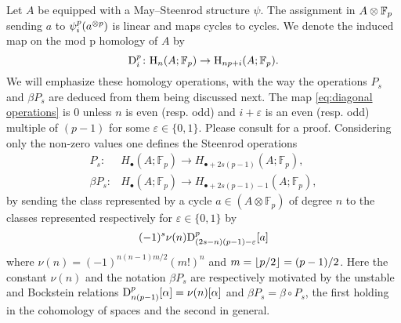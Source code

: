 Let $A$ be equipped with a May--Steenrod structure $\psi$.
The assignment in $A \otimes {\mathbb{F}_p}$ sending $a$ to $\psi_i^p(a^{\otimes p})$ is linear and maps cycles to cycles.
We denote the induced map on the mod p homology of $A$ by
\begin{equation}\label{eq:diagonal operations}
	\mathrm{D}_i^p \colon \mathrm{H}_n(A; {\mathbb{F}_p}) \to \mathrm{H}_{np+i}(A; {\mathbb{F}_p}).
\end{equation}
We will emphasize these homology operations, with the way the operations $P_s$ and $\beta P_s$ are deduced from them being discussed next.
The map \eqref{eq:diagonal operations} is $0$ unless $n$ is even (resp. odd) and $i+\varepsilon$ is an even (resp. odd) multiple of $(p-1)$ for some $\varepsilon \in \{0,1\}$.
Please consult \cite[Proposition 2.3. (iv)]{may1970general} for a proof.
Considering only the non-zero values one defines the Steenrod operations
\begin{align*}
	P_s \colon& H_\bullet(A; \mathbb{F}_p) \to H_{\bullet + 2s(p-1)}(A; \mathbb{F}_p), \\
	\beta P_s \colon& H_\bullet(A; \mathbb{F}_p) \to H_{\bullet + 2s(p-1) - 1}(A; \mathbb{F}_p),
\end{align*}
by sending the class represented by a cycle $a \in (A \otimes \mathbb{F}_p)$ of degree $n$ to the classes represented respectively for $\varepsilon \in \{0,1\}$ by
\begin{equation*}
	(-1)^s \nu(n) \mathrm{D}^p_{(2s-n)(p-1)-\varepsilon}[a]
\end{equation*}
where $\nu(n) = (-1)^{n(n-1)m/2}(m!)^n$ and $m = \lfloor p/2\rfloor = (p-1)/2$.
Here the constant $\nu(n)$ and the notation $\beta P_s$ are respectively motivated by the unstable and Bockstein relations $\mathrm{D}_{n(p-1)}^p[\alpha] = \nu(n)[\alpha]$ and $\beta P_s = \beta \circ P_s$, the first holding in the cohomology of spaces and the second in general.